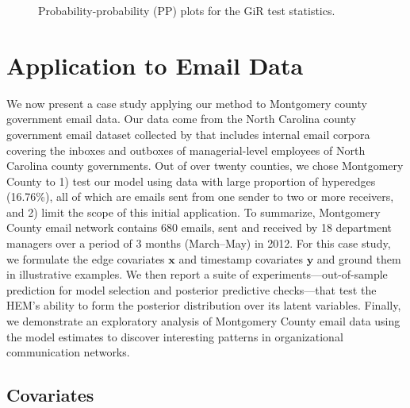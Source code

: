 \documentclass[ba]{imsart}
\numberwithin{equation}{section}
\theoremstyle{plain}
\begin{document}
\begin{figure}[H]
\begin{subfigure}[b]{0.2425\textwidth}
   		   	     		   	   		     		   	   	\end{subfigure}   	   		   	   	   	   		   	   	   		   	   	
   	\caption{Probability-probability (PP) plots for the GiR test statistics.}
   	   	\label{figure:GiRplot}
   \end{figure}
 	   \section{Application to Email Data}\label{subsec:Emails}
 	   We now present a case study applying our method to Montgomery county government email data.
 	   Our data come from the North Carolina county government email dataset collected by \cite{ben2017transparency} that includes internal email corpora covering the inboxes and outboxes of managerial-level employees of North Carolina county governments. Out of over twenty counties, we chose Montgomery County to 1) test our model using data with large proportion of hyperedges (16.76\%), all of which are emails sent from one sender to two or more receivers, and 2) limit the scope of this initial application. To summarize, Montgomery County email network contains 680 emails, sent and received by 18 department managers over a period of 3 months (March--May) in 2012. For this case study,
 	   we formulate the edge covariates $\boldsymbol{x}$ and timestamp covariates $\boldsymbol{y}$ and ground them in illustrative examples. We then report a suite of experiments---out-of-sample prediction for model selection and posterior predictive checks---that test the HEM's ability to form the posterior distribution over its latent variables. Finally, we demonstrate an exploratory analysis of Montgomery County email data using the model estimates to discover interesting patterns in organizational communication networks.
 	   \subsection{Covariates}\label{subsec:Covariates_email}
\end{document}
